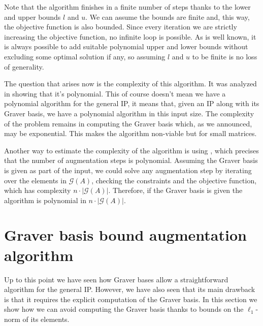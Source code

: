 Note that the algorithm finishes in a finite number of steps thanks to the lower and upper bounds $l$ and $u$. We can assume the bounds are finite and, this way, the objective function is also bounded. Since every iteration we are strictly increasing the objective function, no infinite loop is possible. As is well known, it is always possible to add suitable polynomial upper and lower bounds without excluding some optimal solution if any, so assuming $l$ and $u$ to be finite is no loss of generality.

The question that arises now is the complexity of this algorithm. It was analyzed in \cite[Theorem 3.3]{LHOW:2006} showing that it's polynomial. This of course doesn't mean we have a polynomial algorithm for the general IP, it means that, given an IP along with its Graver basis, we have a polynomial algorithm in this input size. The complexity of the problem remains in computing the Graver basis which, as we announced, may be exponential. This makes the algorithm non-viable but for small matrices. 


Another way to estimate the complexity of the algorithm is using \cite[Theorem 2.b]{HOW:2009}, which precises that the number of augmentation steps is polynomial. Assuming the Graver basis is given as part of the input, we could solve any augmentation step by iterating over the elements in $\mathcal{G}(A)$, checking the constraints and the objective function, which has complexity $n \cdot |\mathcal{G}(A)|$. Therefore, if the Graver basis is given the algorithm is polynomial in $n \cdot |\mathcal{G}(A)|$.


\section{Graver basis bound augmentation algorithm}

Up to this point we have seen how Graver bases allow a straightforward algorithm for the general IP. However, we have also seen that its main drawback is that it requires the explicit computation of the Graver basis. In this section we show how we can avoid computing the Graver basis thanks to bounds on the $\ell_1$-norm of its elements.


